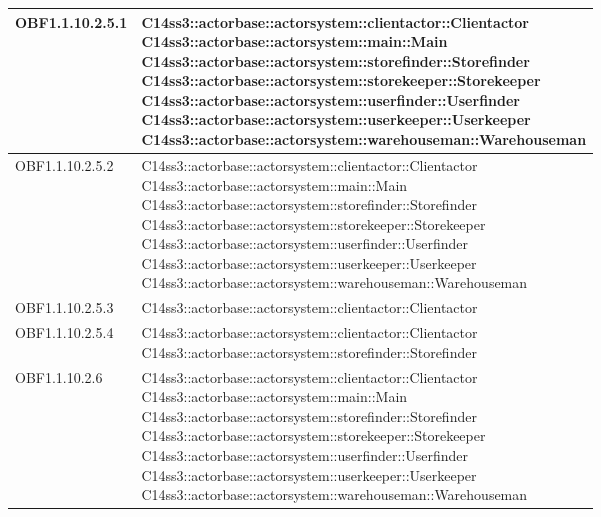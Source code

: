 \documentclass{scalatekids-article}
\begin{document}
\begin{longtable}[H]{|p{4.5cm}|p{13cm}|}
\hline
OBF1.1.10.2.5.1 & \multiLineCell[t]{C14ss3::actorbase::actorsystem::clientactor::Clientactor\\C14ss3::actorbase::actorsystem::main::Main\\C14ss3::actorbase::actorsystem::storefinder::Storefinder\\C14ss3::actorbase::actorsystem::storekeeper::Storekeeper\\C14ss3::actorbase::actorsystem::userfinder::Userfinder\\C14ss3::actorbase::actorsystem::userkeeper::Userkeeper\\C14ss3::actorbase::actorsystem::warehouseman::Warehouseman\\}\\
\hline
OBF1.1.10.2.5.2 & \multiLineCell[t]{C14ss3::actorbase::actorsystem::clientactor::Clientactor\\C14ss3::actorbase::actorsystem::main::Main\\C14ss3::actorbase::actorsystem::storefinder::Storefinder\\C14ss3::actorbase::actorsystem::storekeeper::Storekeeper\\C14ss3::actorbase::actorsystem::userfinder::Userfinder\\C14ss3::actorbase::actorsystem::userkeeper::Userkeeper\\C14ss3::actorbase::actorsystem::warehouseman::Warehouseman\\}\\
\hline
OBF1.1.10.2.5.3 & \multiLineCell[t]{C14ss3::actorbase::actorsystem::clientactor::Clientactor\\}\\
\hline
OBF1.1.10.2.5.4 & \multiLineCell[t]{C14ss3::actorbase::actorsystem::clientactor::Clientactor\\C14ss3::actorbase::actorsystem::storefinder::Storefinder\\}\\
\hline
OBF1.1.10.2.6 & \multiLineCell[t]{C14ss3::actorbase::actorsystem::clientactor::Clientactor\\C14ss3::actorbase::actorsystem::main::Main\\C14ss3::actorbase::actorsystem::storefinder::Storefinder\\C14ss3::actorbase::actorsystem::storekeeper::Storekeeper\\C14ss3::actorbase::actorsystem::userfinder::Userfinder\\C14ss3::actorbase::actorsystem::userkeeper::Userkeeper\\C14ss3::actorbase::actorsystem::warehouseman::Warehouseman\\}\\

\end{longtable}
\end{document}
